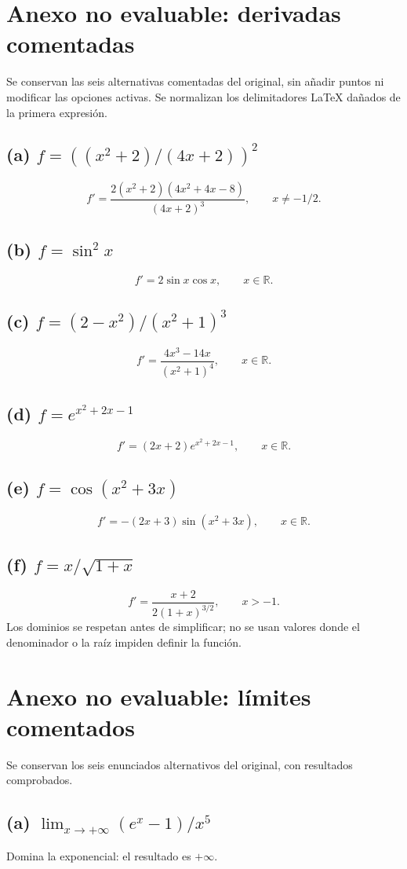 \documentclass[11pt]{article}
\begin{document}
\section*{Anexo no evaluable: derivadas comentadas}
Se conservan las seis alternativas comentadas del original, sin añadir puntos ni modificar las opciones activas. Se normalizan los delimitadores LaTeX dañados de la primera expresión.
\subsection*{(a) $f=((x^2+2)/(4x+2))^2$}
\[\boxed{f'=\frac{2(x^2+2)(4x^2+4x-8)}{(4x+2)^3}},\qquad x\neq-1/2.\]
\subsection*{(b) $f=\sin^2 x$}
\[\boxed{f'=2\sin x\cos x},\qquad x\in\mathbb R.\]
\subsection*{(c) $f=(2-x^2)/(x^2+1)^3$}
\[\boxed{f'=\frac{4x^3-14x}{(x^2+1)^4}},\qquad x\in\mathbb R.\]
\subsection*{(d) $f=e^{x^2+2x-1}$}
\[\boxed{f'=(2x+2)e^{x^2+2x-1}},\qquad x\in\mathbb R.\]
\subsection*{(e) $f=\cos(x^2+3x)$}
\[\boxed{f'=-(2x+3)\sin(x^2+3x)},\qquad x\in\mathbb R.\]
\subsection*{(f) $f=x/\sqrt{1+x}$}
\[\boxed{f'=\frac{x+2}{2(1+x)^{3/2}}},\qquad x>-1.\]
Los dominios se respetan antes de simplificar; no se usan valores donde el denominador o la raíz impiden definir la función.
\clearpage
\section*{Anexo no evaluable: límites comentados}
Se conservan los seis enunciados alternativos del original, con resultados comprobados.
\subsection*{(a) $\displaystyle\lim_{x\to+\infty}(e^x-1)/x^5$}
Domina la exponencial: el resultado es $\boxed{+\infty}$.
\end{document}
